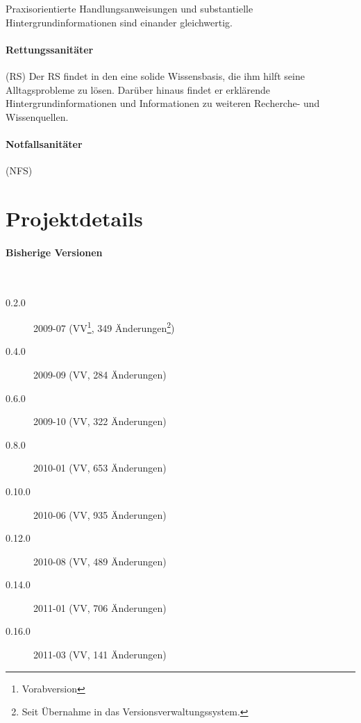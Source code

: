 \documentclass[
ngerman,
paper=a4,
asymmetric,
fontsize=10pt,
draft=false,
numbers=noenddot,
bibtotocnumbered,
footnotes=multiple,
toc=flat,
]{scrbook}
\begin{document}
Praxisorientierte Handlungsanweisungen und substantielle
Hintergrundinformationen sind einander gleichwertig. 

\paragraph{Rettungssanitäter} (RS) 
Der RS findet in den \AASS{} eine solide Wissensbasis, die ihm hilft seine
Alltagsprobleme zu lösen. Darüber hinaus findet er erklärende
Hintergrundinformationen und Informationen zu weiteren Recherche- und
Wissenquellen. 
\paragraph{Notfallsanitäter} (NFS) 






\section{Projektdetails}


\paragraph{Bisherige Versionen}~

\begin{description}
    \item[0.2.0] 2009-07 (VV\footnote{Vorabversion}, 349 Änderungen\footnote{Seit
    Übernahme in das Versionsverwaltungssystem.})
    \item[0.4.0] 2009-09 (VV, 284 Änderungen)
    \item[0.6.0] 2009-10 (VV, 322 Änderungen)
    \item[0.8.0] 2010-01 (VV, 653 Änderungen)
    \item[0.10.0] 2010-06 (VV, 935 Änderungen)
    \item[0.12.0] 2010-08 (VV, 489 Änderungen)
    \item[0.14.0] 2011-01 (VV, 706 Änderungen)
    \item[0.16.0] 2011-03 (VV, 141 Änderungen)
  \end{description}
\end{document}

